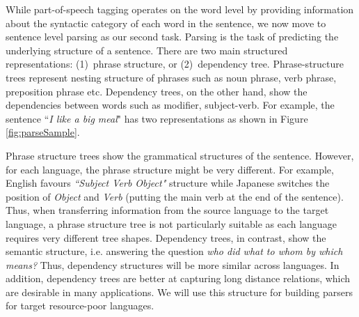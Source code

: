 \documentclass[12pt,twoside,final,hidelinks]{ltthesis}
\theoremstyle{definition}
\begin{document}
While part-of-speech tagging  operates on the word level by providing information about the syntactic category of each word in the sentence, we now move to sentence level parsing as our second task. Parsing is the task of predicting the underlying structure of a sentence. There are two main structured representations: (1)~phrase structure, or (2)~dependency tree. Phrase-structure trees represent nesting structure of phrases such as noun phrase, verb phrase, preposition phrase etc. Dependency trees, on the other hand, show the dependencies between words such as modifier, subject-verb. For example, the sentence ``\textit{I like a big meal}" has two representations as shown in Figure \ref{fig:parseSample}.

Phrase structure trees show the grammatical structures of the sentence. However, for each language, the phrase structure might be very different. For example, English favours \textit{``Subject Verb Object"} structure while Japanese switches the position of \textit{Object} and \textit{Verb} (putting the main verb at the end of the sentence). Thus, when transferring information from the source language to the target language, a phrase structure tree is not particularly suitable as each language requires very different tree shapes. Dependency trees, in contrast, show the semantic structure, i.e. answering the question \textit{who did what to whom by which means?} Thus, dependency structures will be more similar across languages. In addition, dependency trees are better at capturing long distance relations, which are desirable in many applications.  
We will use this structure for building parsers for target resource-poor languages.
\end{document}
